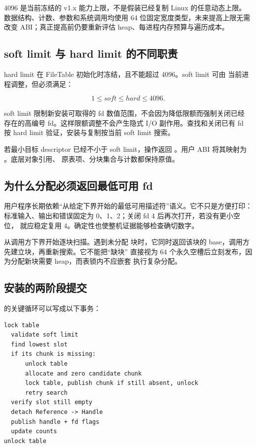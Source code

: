 4096 是当前冻结的 v1.x 能力上限，不是假装已经复制 Linux 的任意动态上限。
数据结构、计数、参数和系统调用均使用 64 位固定宽度类型，未来提高上限无需
改变 ABI；真正提高前仍要重新评估 heap、每进程内存预算与遍历成本。

\subsection{soft limit 与 hard limit 的不同职责}

hard limit 在 FileTable 初始化时冻结，且不能超过 4096。soft limit 可由
当前进程调整，但必须满足：

\[
  1 \le soft \le hard \le 4096.
\]

soft limit 限制新安装可取得的 fd 数值范围，不会因为降低限额而强制关闭已经
存在的高编号 fd。这样限额调整不会产生隐式 I/O 副作用。查找和关闭已有 fd
按 hard limit 验证，安装与复制按当前 soft limit 搜索。

若最小目标 descriptor 已经不小于 soft limit，操作返回
。用户 ABI 将其映射为 。底层对象引用、
原表项、分块集合与计数都保持原值。

\subsection{为什么分配必须返回最低可用 fd}

用户程序长期依赖“从给定下界开始的最低可用描述符”语义。它不只是方便打印：
标准输入、输出和错误固定为 0、1、2；关闭 fd 4 后再次打开，若没有更小空位，
就应稳定复用 4。确定性也使整机证据能够检查确切数字。

 从调用方下界开始逐块扫描。遇到未分配
块时，它同时返回该块的 base，调用方先建立块，再重新搜索。它不能把“缺块”
直接视为 64 个永久空槽后立刻发布，因为分配新块需要 heap，而表锁内不应嵌套
执行复杂分配。

\subsection{安装的两阶段提交}

 的关键循环可以写成以下事务：

\begin{lstlisting}[caption={FileTable 安装的两阶段提交}]
lock table
  validate soft limit
  find lowest slot
  if its chunk is missing:
      unlock table
      allocate and zero candidate chunk
      lock table, publish chunk if still absent, unlock
      retry search
  verify slot still empty
  detach Reference -> Handle
  publish handle + fd flags
  update counts
unlock table
\end{lstlisting}

